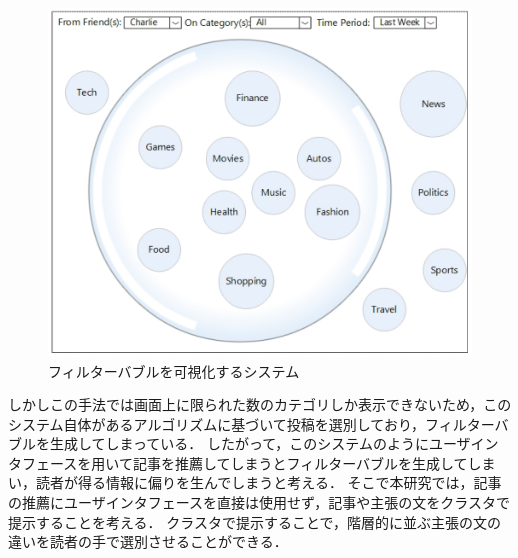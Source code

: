 \documentclass[12pt,a4j]{jreport}
\begin{document}
\begin{figure}[H]
	\centering
	\includegraphics[keepaspectratio, width=120mm]{img/bubble_ui.png}
	\caption{フィルターバブルを可視化するシステム\protect\footnotemark[13]}
	\label{fig_bubble_ui}
\end{figure}

しかしこの手法では画面上に限られた数のカテゴリしか表示できないため，このシステム自体があるアルゴリズムに基づいて投稿を選別しており，フィルターバブルを生成してしまっている．
したがって，このシステムのようにユーザインタフェースを用いて記事を推薦してしまうとフィルターバブルを生成してしまい，読者が得る情報に偏りを生んでしまうと考える．
そこで本研究では，記事の推薦にユーザインタフェースを直接は使用せず，記事や主張の文をクラスタで提示することを考える．
クラスタで提示することで，階層的に並ぶ主張の文の違いを読者の手で選別させることができる．


\end{document}

